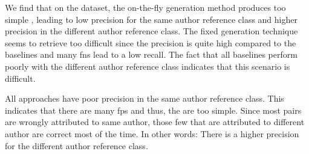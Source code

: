 
We find that on the \dataBlog{} dataset, the on-the-fly generation method produces too simple \imps{}, leading to low precision for the same author reference class and higher precision in the different author reference class.
The fixed \imp{} generation technique seems to retrieve too difficult \imps{} since the precision is quite high compared to the baselines and many \acp{fn} lead to a low recall.
The fact that all baselines perform poorly with the different author reference class indicates that this scenario is difficult.


All approaches have poor precision in the same author reference class.
This indicates that there are many \acp{fp} and thus, the \imps{} are too simple.
Since most pairs are wrongly attributed to same author, those few that are attributed to different author are correct most of the time.
In other words: There is a higher precision for the different author reference class.


